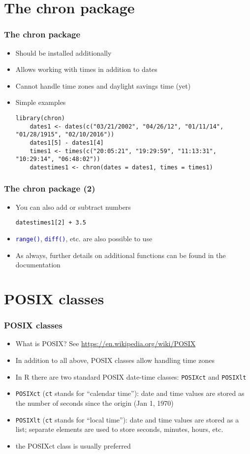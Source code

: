 \documentclass[10pt]{beamer}
\newcommand{\cc}[1]{\texttt{\textcolor{blue}{#1}}}
\theoremstyle{definition}
\begin{document}
\section{The chron package}
\begin{frame}[fragile]
\frametitle{The \textbf{chron} package}
\begin{itemize}
	\item Should be installed additionally
	\item Allows working with times in addition to dates
	\item Cannot handle time zones and daylight savings time (yet)
	\item Simple examples
	\begin{lstlisting}[style = rstyle, breaklines]
	library(chron)
	dates1 <- dates(c("03/21/2002", "04/26/12", "01/11/14", "01/28/1915", "02/10/2016"))
	dates1[5] - dates1[4]
	times1 <- times(c("20:05:21", "19:29:59", "11:13:31", "10:29:14", "06:48:02"))
	datestimes1 <- chron(dates = dates1, times = times1)
	\end{lstlisting}
\end{itemize}
\end{frame}

\begin{frame}[fragile]
\frametitle{The \textbf{chron} package (2)}
\begin{itemize}
	\item You can also add or subtract numbers
	\begin{lstlisting}[style = rstyle, breaklines]
	datestimes1[2] + 3.5
	\end{lstlisting}
	\item \cc{range()}, \cc{diff()}, etc. are also possible to use
	\item As always, further details on additional functions can be found in the documentation
\end{itemize}
\end{frame}

\section{POSIX classes}
\begin{frame}[fragile]
\frametitle{POSIX classes}
\begin{itemize}
	\item What is POSIX? See \url{https://en.wikipedia.org/wiki/POSIX}
	\item In addition to all above, POSIX classes allow handling time zones
	\item In R there are two standard POSIX date-time classes: \texttt{POSIXct} and \texttt{POSIXlt}
	\item \texttt{POSIXct} (\texttt{ct} stands for ``calendar time''): date and time values are stored as the number of seconds since the origin (Jan 1, 1970)
	\item \texttt{POSIXlt} (\texttt{ct} stands for ``local time''): date and time values are stored as a list; separate elements are used to store seconds, minutes, hours, etc. 
	\item the POSIXct class is usually preferred
\end{itemize}
\end{frame}
\end{document}
